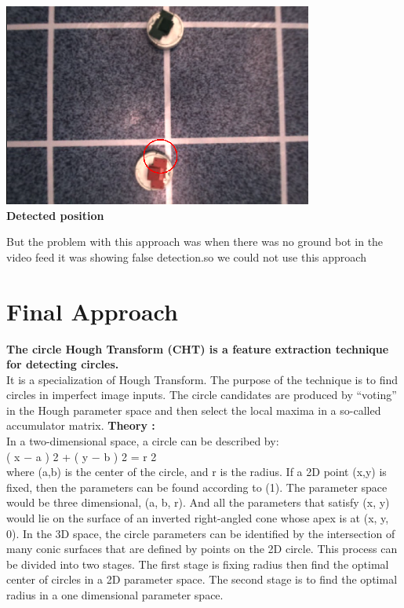 \documentclass[letterpaper, 10 pt, conference]{ieeeconf}
\begin{document}
\includegraphics[scale = 0.85]{Detected.png}\\
\textbf{Detected position}

But the problem with this approach was when there was no ground bot in the video feed it was showing false detection.so we could not use this approach

\section{Final Approach}

\textbf{The circle Hough Transform (CHT) is a feature extraction technique for detecting circles.}\\
 It is a specialization of Hough Transform. The purpose of the technique is to find circles in imperfect image inputs. The circle candidates are produced by “voting” in the Hough parameter space and then select the local maxima in a so-called accumulator matrix. 
\textbf{Theory :}\\
In a two-dimensional space, a circle can be described by:\\
     ( x − a ) 2 + ( y − b ) 2 = r 2           \\

where (a,b) is the center of the circle, and r is the radius. If a 2D point (x,y) is fixed, then the parameters can be found according to (1). The parameter space would be three dimensional, (a, b, r). And all the parameters that satisfy (x, y) would lie on the surface of an inverted right-angled cone whose apex is at (x, y, 0). In the 3D space, the circle parameters can be identified by the intersection of many conic surfaces that are defined by points on the 2D circle. This process can be divided into two stages. The first stage is fixing radius then find the optimal center of circles in a 2D parameter space. The second stage is to find the optimal radius in a one dimensional parameter space. \\
\end{document}
